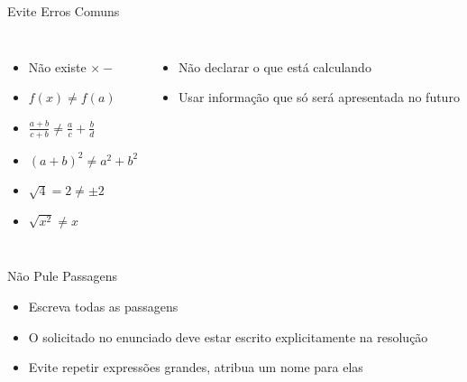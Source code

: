 \documentclass[fleqn,aspectratio=169,12pt]{beamer}
\begin{document}
\begin{frame}{Evite Erros Comuns}
\begin{columns}[t]
  \begin{itemize}[<+->]
    \setlength\itemsep{1.2em}
    \item Não existe $\times-$
    \item \(f(x) \neq f(a)\)
    \item \(\frac{a+b}{c+b} \neq \frac{a}{c}+\frac{b}{d}\)
    \item \((a+b)^2 \neq a^2 + b^2\)
    \item \(\sqrt{4} = 2 \neq \pm 2 \)
    \item \(\sqrt{x^2} \neq x\)
  \end{itemize}
  \begin{itemize}[<+->]
    \setlength\itemsep{1em}
    \item Não declarar o que está calculando
    \item Usar informação que só será apresentada no futuro
  \end{itemize}
\end{columns}
\end{frame}

\begin{frame}{Não Pule Passagens}
  \begin{itemize}[<+->]
    \item Escreva todas as passagens
    \item O solicitado no enunciado deve estar escrito explicitamente na resolução
    \item Evite repetir expressões grandes, atribua um nome para elas
  \end{itemize}
\end{frame}
\end{document}
